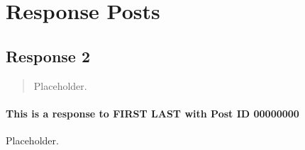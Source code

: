 
\section{Response Posts}
  \subsection{Response 2}
    \begin{quotation}
      Placeholder.
    \end{quotation}

    \paragraph{This is a response to FIRST LAST with Post ID 00000000}
    Placeholder.
